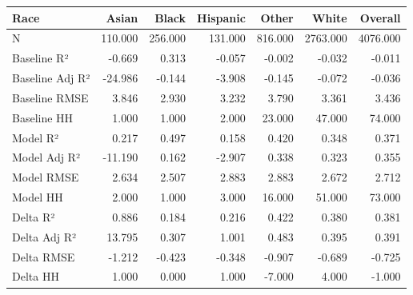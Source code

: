\begin{tabular}{lrrrrrr}
\toprule
Race &   Asian &   Black &  Hispanic &   Other &    White &  Overall \\
\midrule
N               & 110.000 & 256.000 &   131.000 & 816.000 & 2763.000 & 4076.000 \\
Baseline R²     &  -0.669 &   0.313 &    -0.057 &  -0.002 &   -0.032 &   -0.011 \\
Baseline Adj R² & -24.986 &  -0.144 &    -3.908 &  -0.145 &   -0.072 &   -0.036 \\
Baseline RMSE   &   3.846 &   2.930 &     3.232 &   3.790 &    3.361 &    3.436 \\
Baseline HH     &   1.000 &   1.000 &     2.000 &  23.000 &   47.000 &   74.000 \\
Model R²        &   0.217 &   0.497 &     0.158 &   0.420 &    0.348 &    0.371 \\
Model Adj R²    & -11.190 &   0.162 &    -2.907 &   0.338 &    0.323 &    0.355 \\
Model RMSE      &   2.634 &   2.507 &     2.883 &   2.883 &    2.672 &    2.712 \\
Model HH        &   2.000 &   1.000 &     3.000 &  16.000 &   51.000 &   73.000 \\
Delta R²        &   0.886 &   0.184 &     0.216 &   0.422 &    0.380 &    0.381 \\
Delta Adj R²    &  13.795 &   0.307 &     1.001 &   0.483 &    0.395 &    0.391 \\
Delta RMSE      &  -1.212 &  -0.423 &    -0.348 &  -0.907 &   -0.689 &   -0.725 \\
Delta HH        &   1.000 &   0.000 &     1.000 &  -7.000 &    4.000 &   -1.000 \\
\bottomrule
\end{tabular}
